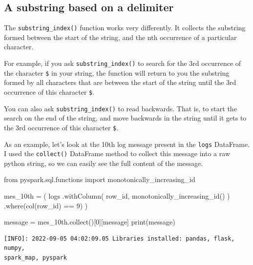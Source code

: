 \documentclass[
  11pt,
  letterpaper,
  DIV=11,
  numbers=noendperiod]{scrreprt}
\newenvironment{Shaded}{\begin{snugshade}}{\end{snugshade}}
\newcommand{\BuiltInTok}[1]{\textcolor[rgb]{0.00,0.23,0.31}{#1}}
\newcommand{\DecValTok}[1]{\textcolor[rgb]{0.68,0.00,0.00}{#1}}
\newcommand{\ImportTok}[1]{\textcolor[rgb]{0.00,0.46,0.62}{#1}}
\newcommand{\NormalTok}[1]{\textcolor[rgb]{0.00,0.23,0.31}{#1}}
\newcommand{\OperatorTok}[1]{\textcolor[rgb]{0.37,0.37,0.37}{#1}}
\newcommand{\StringTok}[1]{\textcolor[rgb]{0.13,0.47,0.30}{#1}}
\begin{document}
\hypertarget{a-substring-based-on-a-delimiter}{%
\subsection{A substring based on a
delimiter}\label{a-substring-based-on-a-delimiter}}

The \texttt{substring\_index()} function works very differently. It
collects the substring formed between the start of the string, and the
nth occurrence of a particular character.

For example, if you ask \texttt{substring\_index()} to search for the
3rd occurrence of the character \texttt{\$} in your string, the function
will return to you the substring formed by all characters that are
between the start of the string until the 3rd occurrence of this
character \texttt{\$}.

You can also ask \texttt{substring\_index()} to read backwards. That is,
to start the search on the end of the string, and move backwards in the
string until it gets to the 3rd occurrence of this character
\texttt{\$}.

As an example, let's look at the 10th log message present in the
\texttt{logs} DataFrame. I used the \texttt{collect()} DataFrame method
to collect this message into a raw python string, so we can easily see
the full content of the message.

\begin{Shaded}
\begin{Highlighting}[]
\ImportTok{from}\NormalTok{ pyspark.sql.functions }\ImportTok{import}\NormalTok{ monotonically\_increasing\_id}

\NormalTok{mes\_10th }\OperatorTok{=}\NormalTok{ (}
\NormalTok{    logs}
\NormalTok{    .withColumn(}
        \StringTok{\textquotesingle{}row\_id\textquotesingle{}}\NormalTok{,}
\NormalTok{        monotonically\_increasing\_id()}
\NormalTok{    )}
\NormalTok{    .where(col(}\StringTok{\textquotesingle{}row\_id\textquotesingle{}}\NormalTok{) }\OperatorTok{==} \DecValTok{9}\NormalTok{)}
\NormalTok{)}

\NormalTok{message }\OperatorTok{=}\NormalTok{ mes\_10th.collect()[}\DecValTok{0}\NormalTok{][}\StringTok{\textquotesingle{}message\textquotesingle{}}\NormalTok{]}
\BuiltInTok{print}\NormalTok{(message)}
\end{Highlighting}
\end{Shaded}

\begin{verbatim}
[INFO]: 2022-09-05 04:02:09.05 Libraries installed: pandas, flask, numpy,
spark_map, pyspark
\end{verbatim}
\end{document}
